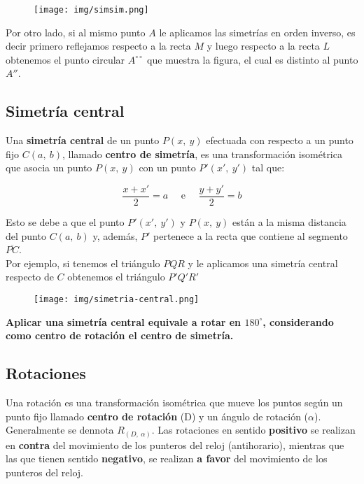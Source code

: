 \begin{figure}[hbt!]
	\centering
	\texttt{[image: img/simsim.png]}
\end{figure}


Por otro lado, si al mismo punto $A$ le aplicamos las simetrías en orden inverso, es decir primero reflejamos respecto a la recta $M$ y luego respecto a la recta $L$ obtenemos el punto circular $A^{\circ\circ}$ que muestra la figura, el cual es distinto al punto $A''$.\\


\subsection{Simetría central}
Una \textbf{simetría central} de un punto $P(x,~y)$ efectuada con respecto a un punto fijo $C(a,~b)$, llamado \textbf{centro de simetría}, es una transformación isométrica que asocia un punto $P(x,~y)$ con un punto $P'(x',~y')$ tal que: 

\[\dfrac{x+x'}{2} = a \quad \text{ e }\quad \dfrac{y + y'}{2} = b  \]

Esto se debe a que el punto $P'(x',~y')$ y $P(x,~y)$ están a la misma distancia del punto $C(a,~b)$ y, además, $P'$ pertenece a la recta que contiene al segmento $\overline{PC}$.\\

Por ejemplo, si tenemos el triángulo $PQR$ y le aplicamos una simetría central respecto de $C$ obtenemos el triángulo $P'Q'R'$
\begin{figure}[hbt!]
	\centering
	\texttt{[image: img/simetria-central.png]}
\end{figure}

\textbf{Aplicar una simetría central equivale a rotar en $180^\circ$, considerando como centro de rotación el centro de simetría.}



\subsection{Rotaciones}
Una  rotación es una transformación isométrica que mueve los puntos según un punto fijo llamado \textbf{centro de rotación} (D) y un ángulo de rotación ($\alpha$). Generalmente se dennota $R_{(D,~\alpha)}$. Las rotaciones en sentido \textbf{positivo} se realizan en \textbf{contra} del movimiento de los punteros del reloj (antihorario), mientras que las que tienen sentido \textbf{negativo}, se realizan \textbf{a favor} del movimiento de los punteros del reloj.\\

